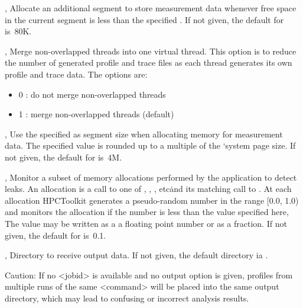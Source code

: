 \documentclass[english]{article}
\begin{document}
\begin{Description}
\item[\OptArg{-lm}{size}, \OptArg{--low-memsize}{size}]
Allocate an additional segment to store measurement data
whenever free space in the current segment is less than the specified .
If not given, the default for  is~80K.

\item[\OptArg{-m}{switch}, \OptArg{--merge-threads}{switch}]  Merge non-overlapped threads into one virtual thread.
                       This option is to reduce the number of generated
                       profile and trace files as each thread generates its own
                       profile and trace data. The options are:
\begin{itemize}
   \item 0 : do not merge non-overlapped threads
   \item 1 : merge non-overlapped threads (default)
\end{itemize}

\item[\OptArg{-ms}{size}, \OptArg{--memsize}{size}]
Use the specified  as segment size when allocating memory for measurement data.
The specified value is rounded up to a multiple of the `system page size.
If not given, the default for  is~4M.

\item[\OptArg{-mp}{prob}, \OptArg{--memleak-prob}{prob}]
Monitor a subset of memory allocations performed by the application to detect leaks.
An allocation is a call to one of , , , etc\.
and its matching call to .
At each allocation HPCToolkit generates a pseudo-random number in the range [0.0, 1.0)
and monitors the allocation if the number is less than the value  specified here,
The value may be written as a a floating point number or as a fraction.
If not given, the default for  is~0.1.

\item[\OptArg{-o}{outpath}, \OptArg{--output}{outpath}]
Directory to receive output data.
If not given, the default directory ia .
\begin{itemize}
 Caution: If no <jobid> is available and no output option is given,
 profiles from multiple runs of the same <command> will be placed into the same output directory,
 which may lead to confusing or incorrect analysis results.
\end{itemize}


\end{Description}
\end{document}
